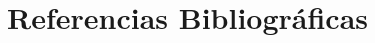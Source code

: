 \documentclass[11pt]{article} %
\begin{document}


\tableofcontents
\newpage








\section*{Referencias Bibliográficas}
\printbibliography[heading=none]
\end{document}
